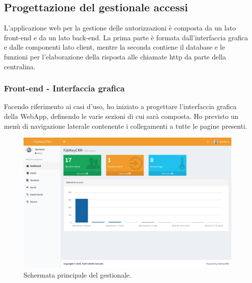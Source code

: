 
\subsection{Progettazione del gestionale accessi}
L'applicazione web per la gestione delle autorizzazioni è composta da un lato front-end e da un lato back-end. La prima parte è formata dall'interfaccia grafica e dalle componenti lato client, mentre la seconda contiene il database e le funzioni per l'elaborazione della risposta alle chiamate http da parte della centralina.

\subsubsection{Front-end - Interfaccia grafica}
Facendo riferimento ai casi d'uso, ho iniziato a progettare l'interfaccia grafica della WebApp, definendo le varie sezioni di cui sarà composta.
Ho previsto un menù di navigazione laterale contenente i collegamenti a tutte le pagine presenti.

\begin{figure}[H]
	\begin{center}
	\includegraphics[scale=0.32]{immagini/dashboard_crm.png}
	\caption{Schermata principale del gestionale.}
	\end{center}
\end{figure}

